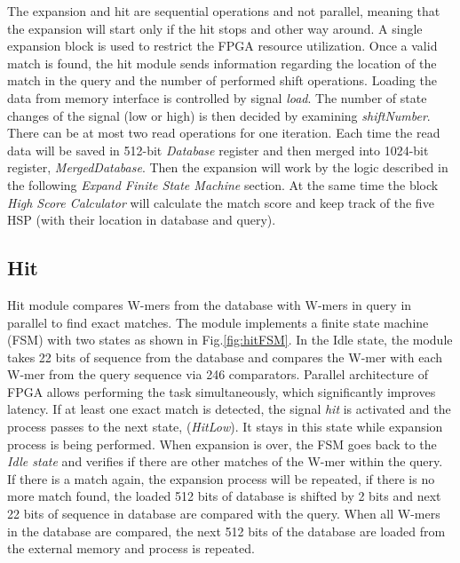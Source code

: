 The expansion and hit are sequential operations and not parallel, meaning that the expansion will start only if the hit stops and other way around. 
A single expansion block is used to restrict the FPGA resource utilization.
Once a valid match is found, the hit module sends information regarding the location of the match in the query and the number of performed shift operations. Loading the data from memory interface is controlled by signal \textit{load}. The number of state changes of the signal (low or high) is then decided by examining \textit{shiftNumber}. There can be at most two read operations for one iteration. Each time the read data will be saved in 512-bit \textit{Database} register and then merged into 1024-bit register, \textit{MergedDatabase}. Then the expansion will work by the logic described in the following \textit{Expand Finite State Machine} section. 
At the same time the block \textit{High Score Calculator} will calculate the match score and keep track of the five HSP (with their location in database and query).    



\subsection{Hit}
Hit module compares W-mers from the database with W-mers in query in parallel to find exact matches. The module implements a finite state machine (FSM) with two states as shown in Fig.\ref{fig:hitFSM}. 
In the Idle state, the module takes 22 bits of sequence from the database and compares the W-mer with each W-mer from the query sequence via 246 comparators. 
Parallel architecture of FPGA allows performing the task simultaneously, which significantly improves latency. 
If at least one exact match is detected, the signal \textit{hit} is activated and the process passes to the next state, (\textit{HitLow}).
It stays in this state while expansion process is being performed. When expansion is over, the FSM goes back to the \textit{Idle state} and verifies if there are other matches of the W-mer within the query. 
If there is a match again, the expansion process will be repeated, if there is no more match found, the loaded 512 bits of database is shifted by 2 bits and next 22 bits of sequence in database are compared with the query. 
When all W-mers in the database are compared, the next 512 bits of the database are loaded from the external memory and process is repeated. 

